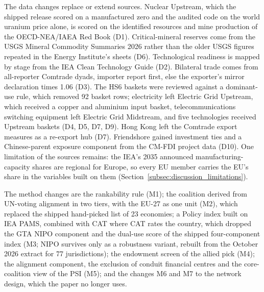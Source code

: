 The data changes replace or extend sources. Nuclear Upstream, which the shipped release scored on a
manufactured zero and the audited code on the world uranium price alone, is scored on the identified
resources and mine production of the OECD-NEA/IAEA Red Book \citep{oecdnea2026uranium} (D1). Critical-mineral reserves come from the USGS
Mineral Commodity Summaries 2026 \citep{usgs2026mcs} rather than the older USGS figures repeated in
the Energy Institute's sheets (D6). Technological readiness is mapped by stage from the IEA Clean
Technology Guide \citep{iea2026cleantechguide} (D2). Bilateral trade comes from all-reporter
Comtrade dyads, importer report first, else the exporter's mirror declaration times 1.06 (D3). The
HS6 baskets were reviewed against a dominant-use rule, which removed 92 basket rows; electricity
left Electric Grid Upstream, which received a copper and aluminium input basket, telecommunications
switching equipment left Electric Grid Midstream, and five technologies received Upstream baskets
(D4, D5, D7, D9). Hong Kong left the Comtrade export measures as a re-export hub (D7). Friendshore
gained investment ties and a Chinese-parent exposure component from the CM-FDI project data
\citep{bandara2026cmfdi} (D10). One limitation of the sources remains: the IEA's 2035 announced
manufacturing-capacity shares are regional for Europe, so every EU member carries the EU's share in
the variables built on them (Section~\ref{subsec:discussion_limitations}).

The method changes are the rankability rule (M1); the coalition derived from UN-voting alignment in
two tiers, with the EU-27 as one unit (M2), which replaced the shipped hand-picked list of 23
economies; a Policy index built on IEA PAMS, combined with CAT where CAT rates the country, which
dropped the GTA NIPO component and the dual-use score of the shipped four-component index (M3; NIPO
survives only as a robustness variant, rebuilt from the October 2026 extract for 77 jurisdictions);
the endowment screen of the allied pick (M4); the alignment component, the exclusion of conduit
financial centres and the core-coalition view of the PSI (M5); and the changes M6 and M7 to the
network design, which the paper no longer uses.


